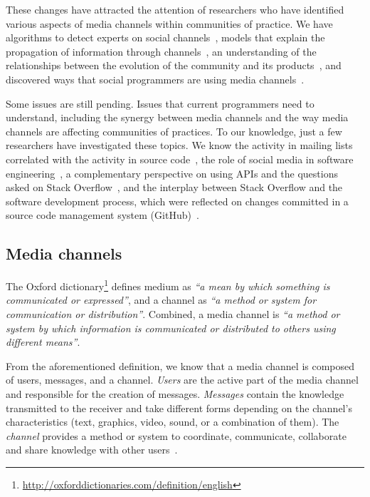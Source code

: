 \documentclass{sig-alternate-05-2015}
\begin{document}
	These changes have attracted the attention of researchers who have identified various aspects of media channels within communities of practice.
	We have algorithms to detect experts on social channels~\cite{Pal2011a,Pal2012a}, models that explain the propagation of information through channels~\cite{Jin2013, Jiang2013}, an understanding of the relationships between the evolution of the community and its products~\cite{German2013}, and discovered ways that social programmers are using media channels~\cite{Sowe2008a, Singh2009, Parnin2013}.

	Some issues are still pending.
	Issues that current programmers need to understand, including the synergy between media channels and the way media channels are affecting communities of practices.
	To our knowledge, just a few researchers have investigated these topics.
	We know the activity in mailing lists correlated with the activity in source code~\cite{Bird2006}, the role of social media in software engineering~\cite{Storey2014, Storey2010}, a complementary perspective on using APIs and the questions asked on Stack Overflow~\cite{Kavaler2013}, and the interplay between Stack Overflow and the software development process, which were reflected on changes committed in a source code management system (GitHub)~\cite{Vasilescu2013a}.

\subsection{Media channels}

	The Oxford dictionary\footnote{\url{http://oxforddictionaries.com/definition/english}} defines medium as \textit{``a mean by which something is communicated or expressed''}, and a channel as \textit{``a method or system for communication or distribution''}.
	Combined, a media channel is \textit{``a method or system by which information is communicated or distributed to others using different means''}.

	From the aforementioned definition, we know that a media channel is composed of users, messages, and a channel. 
	\textit{Users} are the active part of the media channel and responsible for the creation of messages.
	\textit{Messages} contain the knowledge transmitted to the receiver and take different forms depending on the channel's characteristics (text, graphics, video, sound, or a combination of them).
	The \textit{channel} provides a method or system to coordinate, communicate, collaborate and share knowledge with other users~\cite{Storey2014}.
\end{document}
